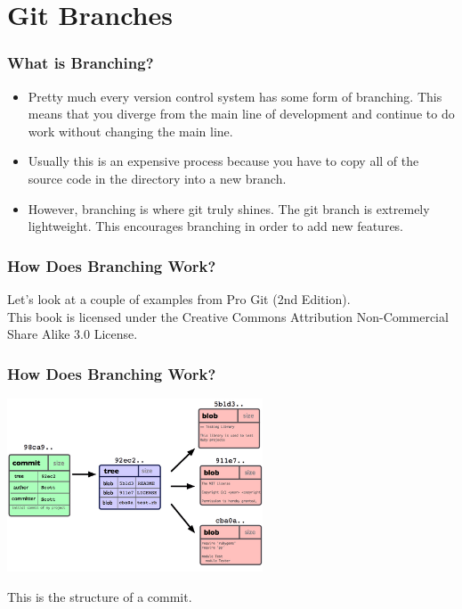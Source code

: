 
\section[Branching]{Git Branches}

\begin{frame}
\frametitle{\large What is Branching?}
\begin{itemize}
\item Pretty much every version control system has some form of branching. This means that you diverge from the main line of development and continue to do work without changing the main line.
\pause
\item Usually this is an expensive process because you have to copy all of the source code in the directory into a new branch.
\pause
\item However, branching is where git truly shines. The git branch is extremely lightweight. This encourages branching in order to add new features.
\end{itemize}
\end{frame}
\note{}

\begin{frame}
\frametitle{\large How Does Branching Work?}
\begin{center}
Let's look at a couple of examples from Pro Git (2nd Edition). \\
This book is licensed under the Creative Commons Attribution Non-Commercial Share Alike 3.0 License.
\end{center}
\end{frame}
\note{}

\begin{frame}
\frametitle{\large How Does Branching Work?}
\begin{center}
\includegraphics[width=0.57\textwidth]{img/branching_images/fig1.png}
\end{center}
\vspace{2mm}
\begin{center}
This is the structure of a commit.
\end{center}
\end{frame}
\note{}

